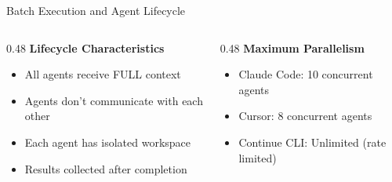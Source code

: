 \documentclass[aspectratio=169,11pt]{beamer}
\begin{document}
\begin{frame}{Batch Execution and Agent Lifecycle}
    \vspace{0.2cm}
    \begin{columns}[T]
        \begin{column}{0.48\textwidth}
            \textbf{Lifecycle Characteristics}
            \begin{itemize}
                \footnotesize
                \item All agents receive FULL context
                \item Agents don't communicate with each other
                \item Each agent has isolated workspace
                \item Results collected after completion
            \end{itemize}
        \end{column}
        \begin{column}{0.48\textwidth}
            \textbf{Maximum Parallelism}
            \begin{itemize}
                \footnotesize
                \item Claude Code: 10 concurrent agents
                \item Cursor: 8 concurrent agents
                \item Continue CLI: Unlimited (rate limited)
            \end{itemize}
        \end{column}
    \end{columns}
\end{frame}
\end{document}
